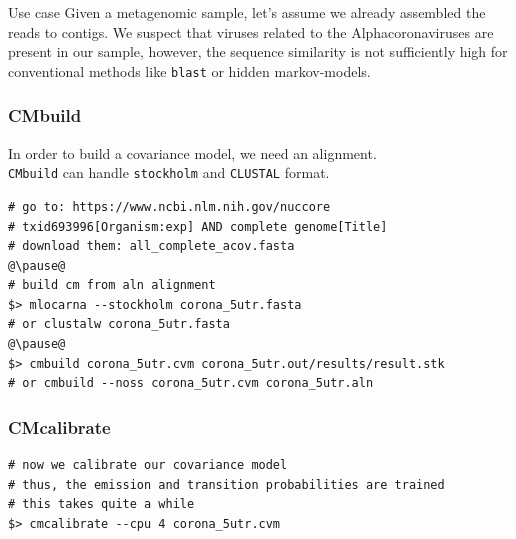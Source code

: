 \begin{frame}[c]{}
    \begin{block}{Use case}
        Given a metagenomic sample, let's assume we already assembled the reads to contigs.
        We suspect that viruses related to the Alphacoronaviruses are present in our sample, however,
        the sequence similarity is not sufficiently high for conventional methods like \texttt{blast} 
        or hidden markov-models.
    \end{block}
\end{frame}



\begin{frame}[c, fragile]\frametitle{CMbuild}
    In order to build a covariance model, we need an alignment.\\
    \texttt{CMbuild} can handle \texttt{stockholm} and \texttt{CLUSTAL} format.
\begin{lstlisting}
# go to: https://www.ncbi.nlm.nih.gov/nuccore
# txid693996[Organism:exp] AND complete genome[Title]
# download them: all_complete_acov.fasta
@\pause@
# build cm from aln alignment
$> mlocarna --stockholm corona_5utr.fasta
# or clustalw corona_5utr.fasta
@\pause@
$> cmbuild corona_5utr.cvm corona_5utr.out/results/result.stk
# or cmbuild --noss corona_5utr.cvm corona_5utr.aln
\end{lstlisting}
\vspace{2em}
\end{frame}

\begin{frame}[c,fragile]\frametitle{CMcalibrate}
    \begin{lstlisting}
# now we calibrate our covariance model
# thus, the emission and transition probabilities are trained
# this takes quite a while
$> cmcalibrate --cpu 4 corona_5utr.cvm
    \end{lstlisting}
\vspace{2em}
\end{frame}

